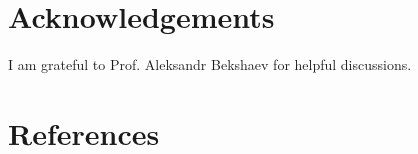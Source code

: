 \documentclass[12pt, a4paper, superscriptaddress, final]{iopart}
\begin{document}

\section*{Acknowledgements}

I am grateful to Prof. Aleksandr Bekshaev for helpful discussions.


\section*{References}


\end{document}
